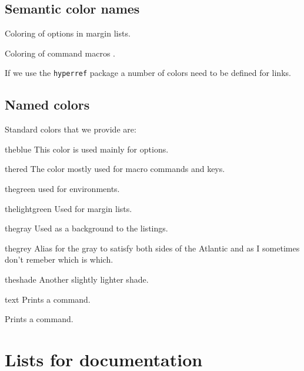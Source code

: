 \subsection{Semantic color names}
\begin{marglist}
\item [\option{theoption}] Coloring of options in margin lists.
\item [\option{themacro}] Coloring of command macros .
\item [\option{hyperlink}] If we use the \texttt{hyperref} package a number of colors need to be defined for links.
\end{marglist}

\subsection{Named colors}
Standard colors that we provide are:
\begin{marglist}
\item [\textcolor{theblue}{theblue}] This color is used mainly for options.
\item [\textcolor{thered}{thered}] The color mostly used for macro commands and keys.
\item [\textcolor{thegreen}{thegreen}] used for environments.
\item [\textcolor{thelightgreen}{thelightgreen}] Used for margin lists.
\item [\textcolor{thegray}{thegray}] Used as a background to the listings.
\item [\colorbox{thegrey}{\color{white}thegrey}] Alias for the gray to satisfy both sides of the Atlantic and as I sometimes don't remeber which is which.
\item [\colorbox{theshade}{theshade}] Another slightly lighter shade.
\end{marglist}



\begin{marglist}
\item [\cs{cs}]  text Prints a command.
\item [\cs{cmd}] Prints a command.
\end{marglist}




\section{Lists for documentation}



